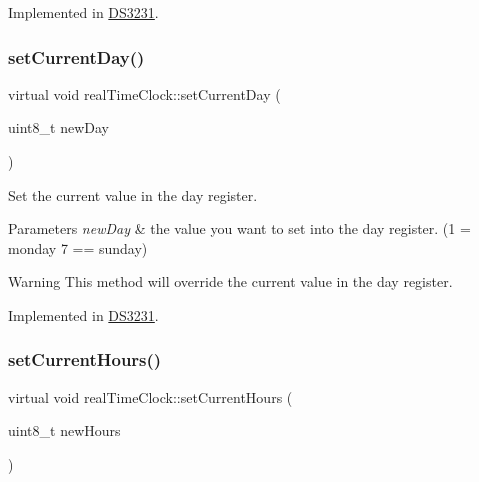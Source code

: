 Implemented in \mbox{\hyperlink{class_d_s3231_a597a0d5cb33f8b60f81dba9050ca1363}{D\+S3231}}.

\mbox{\label{classreal_time_clock_a4a80a695cbb55860921f92509fae0cd0}} 
\subsubsection{\texorpdfstring{set\+Current\+Day()}{setCurrentDay()}}
{\footnotesize\ttfamily virtual void real\+Time\+Clock\+::set\+Current\+Day (\begin{DoxyParamCaption}\item[{uint8\+\_\+t}]{new\+Day }\end{DoxyParamCaption})\hspace{0.3cm}{\ttfamily [pure virtual]}}



Set the current value in the day register. 


\begin{DoxyParams}{Parameters}
{\em new\+Day} & the value you want to set into the day register. (1 = monday 7 == sunday) \\
\hline
\end{DoxyParams}
\begin{DoxyWarning}{Warning}
This method will override the current value in the day register. 
\end{DoxyWarning}


Implemented in \mbox{\hyperlink{class_d_s3231_ae43a887db6022008c066a257acd68ae8}{D\+S3231}}.

\mbox{\label{classreal_time_clock_a515d9de6067ae563bff5217da5100a23}} 
\subsubsection{\texorpdfstring{set\+Current\+Hours()}{setCurrentHours()}}
{\footnotesize\ttfamily virtual void real\+Time\+Clock\+::set\+Current\+Hours (\begin{DoxyParamCaption}\item[{uint8\+\_\+t}]{new\+Hours }\end{DoxyParamCaption})\hspace{0.3cm}{\ttfamily [pure virtual]}}



